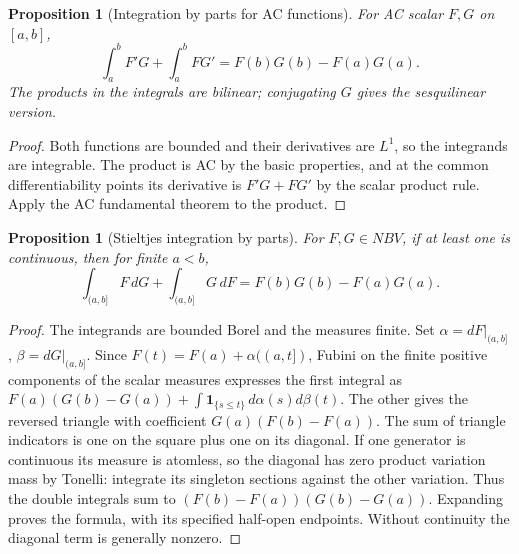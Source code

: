 \documentclass[11pt,oneside,openany]{book}
\newtheorem{proposition}[theorem]{Proposition}
\theoremstyle{definition}
\theoremstyle{remark}
\newcommand{\one}{\mathbf1}\newcommand{\ind}[1]{\mathbf1_{#1}}
\newcommand{\family}[1]{}
\begin{document}
\begin{proposition}[Integration by parts for AC functions]\family{D11.12.ac_integration_parts}\label{d11:12:ac-integration-parts}
For AC scalar $F,G$ on $[a,b]$,
\[
 \int_a^bF'G+\int_a^bFG'=F(b)G(b)-F(a)G(a).
\]
The products in the integrals are bilinear; conjugating $G$ gives the
sesquilinear version.
\end{proposition}
\begin{proof}
Both functions are bounded and their derivatives are $L^1$, so the
integrands are integrable. The product is AC by the basic properties, and
at the common differentiability points its derivative is $F'G+FG'$ by
the scalar product rule. Apply the AC fundamental theorem to the product.
\end{proof}

\begin{proposition}[Stieltjes integration by parts]\family{D11.12.stieltjes_integration_parts}\label{d11:12:stieltjes-integration-parts}
For $F,G\in NBV$, if at least one is continuous, then for finite $a<b$,
\[
 \int_{(a,b]}F\,dG+\int_{(a,b]}G\,dF=F(b)G(b)-F(a)G(a).
\]
\end{proposition}
\begin{proof}
The integrands are bounded Borel and the measures finite. Set
$\alpha=dF|_{(a,b]}$, $\beta=dG|_{(a,b]}$.
Since $F(t)=F(a)+\alpha((a,t])$, Fubini on the finite positive
components of the scalar measures expresses the first integral as
$F(a)(G(b)-G(a))+\int\one_{\{s\leq t\}}\,d\alpha(s)d\beta(t)$.
The other gives the reversed triangle with coefficient
$G(a)(F(b)-F(a))$. The sum of triangle indicators is one on the square
plus one on its diagonal. If one generator is continuous its measure is
atomless, so the diagonal has zero product variation mass by Tonelli:
integrate its singleton sections against the other variation. Thus the
double integrals sum to $(F(b)-F(a))(G(b)-G(a))$. Expanding proves the
formula, with its specified half-open endpoints. Without continuity the
diagonal term is generally nonzero.
\end{proof}
\end{document}
